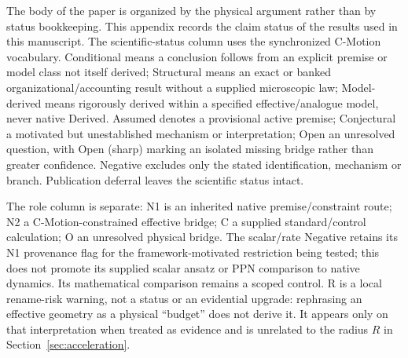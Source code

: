 \documentclass[11pt]{article}
\theoremstyle{plain}
\theoremstyle{remark}
\begin{document}
The body of the paper is organized by the physical argument rather than by status
bookkeeping.  This appendix records the claim status of the
results used in this manuscript.  The scientific-status column uses the synchronized
C-Motion vocabulary.  Conditional means a conclusion follows from an explicit
premise or model class not itself derived; Structural means an exact or banked
organizational/accounting result without a supplied microscopic law;
Model-derived means rigorously derived within a specified effective/analogue
model, never native Derived.  Assumed denotes a provisional active premise;
Conjectural a motivated but unestablished mechanism or interpretation; Open an
unresolved question, with Open (sharp) marking an isolated missing bridge rather
than greater confidence.  Negative excludes only the stated identification,
mechanism or branch.  Publication deferral leaves the scientific status intact.

The role column is separate: N1 is an inherited native premise/constraint route;
N2 a C-Motion-constrained effective bridge; C a supplied standard/control
calculation; O an unresolved physical bridge.  The scalar/rate Negative retains
its N1 provenance flag for the framework-motivated restriction being tested;
this does not promote its supplied scalar ansatz or PPN comparison to native
dynamics.  Its mathematical comparison remains a scoped control.
R is a local rename-risk warning, not a status or an evidential upgrade:
rephrasing an effective geometry as a physical ``budget'' does not derive it.
It appears only on that interpretation when treated as evidence and is
unrelated to the radius $R$ in Section~\ref{sec:acceleration}.
\end{document}
